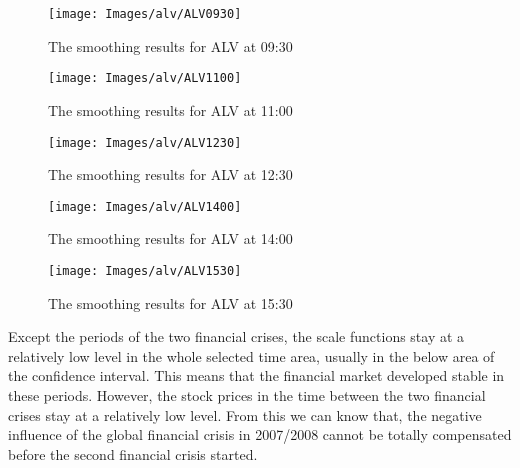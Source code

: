 \begin{figure}[!htbp]
	\centering
	\texttt{[image: Images/alv/ALV0930]}
	\caption[The smoothing results for ALV at 09:30]{The smoothing results for ALV at 09:30}
	\label{fig:ALV0930}
\end{figure}


\begin{figure}[!htbp]
	\centering
	\texttt{[image: Images/alv/ALV1100]}
	\caption[The smoothing results for ALV at 11:00]{The smoothing results for ALV at 11:00}
	\label{fig:ALV1100}
\end{figure}

\begin{figure}[!htbp]
	\centering
	\texttt{[image: Images/alv/ALV1230]}
	\caption[The smoothing results for ALV at 12:30]{The smoothing results for ALV at 12:30}
	\label{fig:ALV1230}
\end{figure}

\begin{figure}[!htbp]
	\centering
	\texttt{[image: Images/alv/ALV1400]}
	\caption[The smoothing results for ALV at 14:00]{The smoothing results for ALV at 14:00}
	\label{fig:ALV1400}
\end{figure}

\begin{figure}[!htbp]
	\centering
	\texttt{[image: Images/alv/ALV1530]}
	\caption[The smoothing results for ALV at 15:30]{The smoothing results for ALV at 15:30}
	\label{fig:ALV1530}
\end{figure}

Except the periods of the two financial crises, the scale functions stay at a relatively low level in the whole selected time area, usually in the below area of the confidence interval. This means that the financial market developed stable in these periods. However, the stock prices in the time between the two financial crises stay at a relatively low level. From this we can know that, the negative influence of the global financial crisis in 2007/2008 cannot be totally compensated before the second financial crisis started. 

